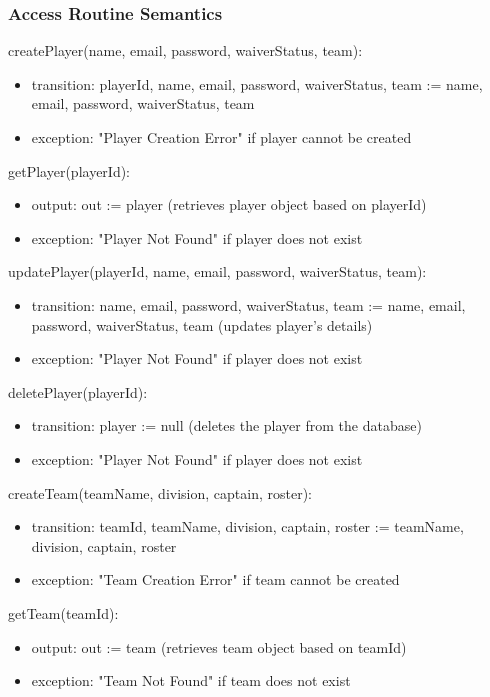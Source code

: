 \documentclass[12pt, titlepage]{article}
\begin{document}
\subsubsection{Access Routine Semantics}

\noindent createPlayer(name, email, password, waiverStatus, team):
\begin{itemize}
  \item transition: playerId, name, email, password, waiverStatus, team := name, email, password, waiverStatus, team
  \item exception: "Player Creation Error" if player cannot be created
\end{itemize}

\noindent getPlayer(playerId):
\begin{itemize}
  \item output: out := player (retrieves player object based on playerId)
  \item exception: "Player Not Found" if player does not exist
\end{itemize}

\noindent updatePlayer(playerId, name, email, password, waiverStatus, team):
\begin{itemize}
  \item transition: name, email, password, waiverStatus, team := name, email, password, waiverStatus, team (updates player's details)
  \item exception: "Player Not Found" if player does not exist
\end{itemize}

\noindent deletePlayer(playerId):
\begin{itemize}
  \item transition: player := null (deletes the player from the database)
  \item exception: "Player Not Found" if player does not exist
\end{itemize}

\noindent createTeam(teamName, division, captain, roster):
\begin{itemize}
  \item transition: teamId, teamName, division, captain, roster := teamName, division, captain, roster
  \item exception: "Team Creation Error" if team cannot be created
\end{itemize}

\noindent getTeam(teamId):
\begin{itemize}
  \item output: out := team (retrieves team object based on teamId)
  \item exception: "Team Not Found" if team does not exist
\end{itemize}
\end{document}
